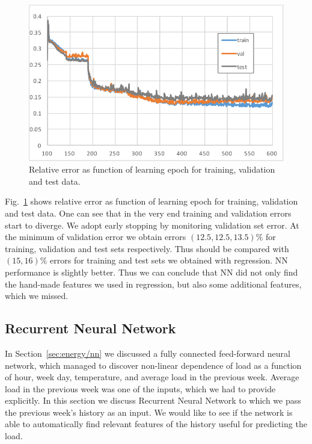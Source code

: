 \documentclass{article} %
\begin{document}
\begin{figure}[h]
\begin{center}
\includegraphics[width=0.7\linewidth]{energy_NN_learning.pdf}	
\end{center}
\caption{Relative error as function of learning epoch for training, 
validation and test data.}
\label{fig:energy/nn/learn}
\end{figure}
Fig.~\ref{fig:energy/nn/learn} shows relative error as function of 
learning epoch for training, validation and test data.
One can see that in the very end training and validation errors start to diverge.
We adopt early stopping by monitoring validation set error.
At the minimum of validation error we obtain errors $(12.5,12.5,13.5)\%$
for training, validation and test sets respectively.
Thus should be compared with $(15,16)\%$ errors for training and test sets
we obtained with regression. NN performance is slightly better.
Thus we can conclude that NN did not only find the hand-made features we used
in regression, but also some additional features, which we missed.


\subsection{Recurrent Neural Network}
\label{sec:energy/rnn}

In Section~\ref{sec:energy/nn} we discussed a fully connected feed-forward
neural network, which managed to discover non-linear dependence
of load as a function of hour, week day, temperature, and average load in 
the previous week. Average load in the previous week was one of the inputs,
which we had to provide explicitly. In this section we discuss
Recurrent Neural Network to which we pass the previous week's history
as an input. 
We would like to see if the network is able to automatically find relevant 
features of the history useful for predicting the load.
\end{document}
